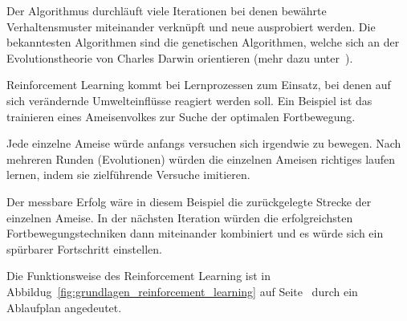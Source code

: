 Der Algorithmus durchläuft viele Iterationen bei denen bewährte Verhaltensmuster miteinander verknüpft und neue
ausprobiert werden. Die bekanntesten Algorithmen sind die genetischen Algorithmen, welche sich an der Evolutionstheorie
von Charles Darwin orientieren (mehr dazu unter~\cite{book_grundlagen_learnings}).

Reinforcement Learning kommt bei Lernprozessen zum Einsatz, bei denen auf sich verändernde Umwelteinflüsse reagiert
werden soll. Ein Beispiel ist das trainieren eines Ameisenvolkes zur Suche der optimalen Fortbewegung.

Jede einzelne Ameise würde anfangs versuchen sich irgendwie zu bewegen. Nach mehreren Runden (Evolutionen) würden die
einzelnen Ameisen richtiges laufen lernen, indem sie zielführende Versuche imitieren.

Der messbare Erfolg wäre in diesem Beispiel die zurückgelegte Strecke der einzelnen Ameise. In der nächsten Iteration
würden die erfolgreichsten Fortbewegungstechniken dann miteinander kombiniert und es würde sich ein spürbarer
Fortschritt einstellen.

Die Funktionsweise des Reinforcement Learning ist in Abbildug~\ref{fig:grundlagen_reinforcement_learning} auf
Seite~\pageref{fig:grundlagen_reinforcement_learning} durch ein Ablaufplan angedeutet.

